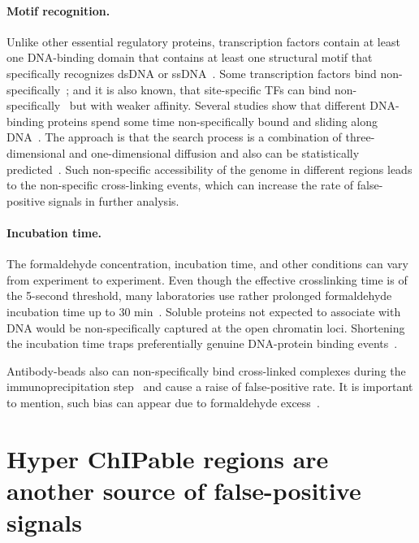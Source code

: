 \paragraph{Motif recognition.}
Unlike other essential regulatory proteins, transcription factors contain at least one DNA-binding domain that contains at least one structural motif that specifically recognizes dsDNA or ssDNA~\cite{mitchell1989transcriptional}.
Some transcription factors bind non-specifically~\cite{struhl2007interpreting};
and it is also known, that site-specific TFs can bind non-specifically~\cite{hammar2012lac,mirny2009protein} but with weaker affinity.
Several studies show that different DNA-binding proteins spend some time non-specifically bound and sliding along DNA~\cite{slutsky2004kinetics,mirny2010nucleosome,cherstvy2008protein,hu2006proteins,sheinman2009effects}.
The approach is that the search process is a combination of three-dimensional and one-dimensional diffusion and also can be statistically predicted~\cite{sela2011dna}.
Such non-specific accessibility of the genome in different regions leads to the non-specific cross-linking events, which can increase the rate of false-positive signals in further analysis.

\paragraph{Incubation time.}
The formaldehyde concentration, incubation time, and other conditions can vary from experiment to experiment. 
Even though the effective crosslinking time is of the 5-second threshold, many laboratories use rather prolonged formaldehyde incubation time up to 30 min~\cite{schmiedeberg2009temporal}.
Soluble proteins not expected to associate with DNA would be non-specifically captured at the open chromatin loci. 
Shortening the incubation time traps preferentially genuine DNA-protein binding events~\cite{baranello2016chip}.

Antibody-beads also can non-specifically bind cross-linked complexes during the immunoprecipitation step~\cite{zhu2014fast} and cause a raise of false-positive rate.
It is important to mention, such bias can appear due to formaldehyde excess~\cite{hanson2018using}.

\section{Hyper ChIPable regions are another source of false-positive signals}

